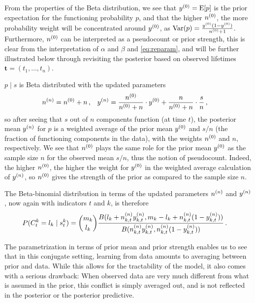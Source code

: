 \documentclass[authoryear, 12pt, a4paper]{elsarticle}
\newcommand{\bs}[1]{\boldsymbol{#1}}
\renewcommand{\vec}[1]{{\bs#1}}
\newcommand{\E}{\operatorname{E}}
\newcommand{\V}{\operatorname{Var}}
\newcommand{\td}[1]{%
  \iftoggle{td}{%
    \todo[inline]{#1}%
  }{}%
}
\begin{document}
From the properties of the Beta distribution,
we see that $\yz = \E[p]$ is the prior expectation for the functioning probability $p$,
and that the higher $n^{(0)}$, the more probability weight will be concentrated around $y^{(0)}$,
as $\V(p) = \frac{\yz (1-\yz)}{\nz + 1}$.
Furthermore, $n^{(0)}$ can be interpreted as a pseudocount or prior strength,
this is clear from the interpretation of $\alpha$ and $\beta$ and \eqref{eq:reparam},
and will be further illustrated below through revisiting the posterior
based on observed lifetimes $\vec{t} = (t_1, \ldots, t_{n})$.

$p \mid s$ is Beta distributed with the updated parameters
\begin{align}
n^{(n)} &= n^{(0)} + n\,, &
y^{(n)} &= \frac{n^{(0)}}{n^{(0)} + n} \cdot y^{(0)} + \frac{n}{n^{(0)} + n} \cdot \frac{s}{n}\,,
\label{eq:nyupdate}
\end{align}
so after seeing that $s$ out of $n$ components function (at time $t$),
the posterior mean $y^{(n)}$ for $p$ is a weighted average of
the prior mean $y^{(0)}$ and $s/n$ (the fraction of functioning components in the data),
with the weights $n^{(0)}$ and $n$, respectively.
We see that $n^{(0)}$ plays the same role for the prior mean $y^{(0)}$
as the sample size $n$ for the observed mean $s/n$,
thus the notion of pseudocount.
Indeed, the higher $n^{(0)}$, the higher the weight for $y^{(0)}$
in the weighted average calculation of $y^{(n)}$,
so $n^{(0)}$ gives the strength of the prior as compared to the sample size $n$.

The Beta-binomial distribution in terms of the updated parameters $n^{(n)}$ and $y^{(n)}$,
now again with indicators $t$ and $k$,
is therefore
\begin{align}
P(C^k_t = l_k \mid s^k_t) &= {m_k \choose l_k} \frac{B(l_k + n^{(n)}_{k,t}y^{(n)}_{k,t}, m_k - l_k + n^{(n)}_{k,t}(1-y^{(n)}_{k,t}))}
                                                    {B(n^{(n)}_{k,t}y^{(n)}_{k,t}, n^{(n)}_{k,t}(1-y^{(n)}_{k,t}))} \,.
\label{eq:postpredCny}
\end{align}
\td{leave this equation out???}

The parametrization in terms of prior mean and prior strength
enables us to see that in this conjugate setting,
learning from data amounts to averaging between prior and data.
While this allows for the tractability of the model,
it also comes with a serious drawback:
When observed data are very much different from what is assumed in the prior,
this conflict is simply averaged out,
and is not reflected in the posterior or the posterior predictive.
\end{document}
